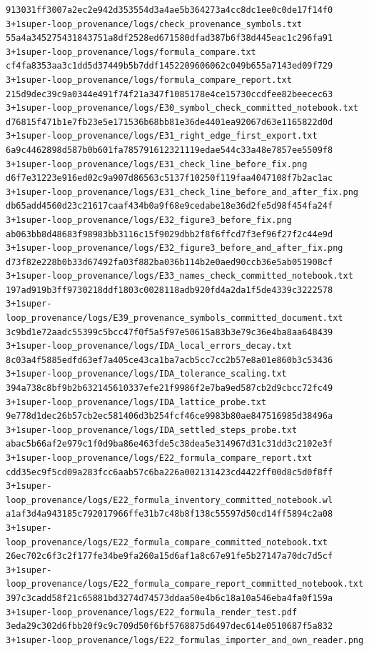 \documentclass[
  10pt,
]{article}
\begin{document}
\begin{verbatim}
913031ff3007a2ec2e942d353554d3a4ae5b364273a4cc8dc1ee0c0de17f14f0  3+1super-loop_provenance/logs/check_provenance_symbols.txt
55a4a345275431843751a8df2528ed671580dfad387b6f38d445eac1c296fa91  3+1super-loop_provenance/logs/formula_compare.txt
cf4fa8353aa3c1dd5d37449b5b7ddf1452209606062c049b655a7143ed09f729  3+1super-loop_provenance/logs/formula_compare_report.txt
215d9dec39c9a0344e491f74f21a347f1085178e4ce15730ccdfee82beecec63  3+1super-loop_provenance/logs/E30_symbol_check_committed_notebook.txt
d76815f471b1e7fb23e5e171536b68bb81e36de4401ea92067d63e1165822d0d  3+1super-loop_provenance/logs/E31_right_edge_first_export.txt
6a9c4462898d587b0b601fa785791612321119edae544c33a48e7857ee5509f8  3+1super-loop_provenance/logs/E31_check_line_before_fix.png
d6f7e31223e916ed02c9a907d86563c5137f10250f119faa4047108f7b2ac1ac  3+1super-loop_provenance/logs/E31_check_line_before_and_after_fix.png
db65add4560d23c21617caaf434b0a9f68e9cedabe18e36d2fe5d98f454fa24f  3+1super-loop_provenance/logs/E32_figure3_before_fix.png
ab063bb8d48683f98983bb3116c15f9029dbb2f8f6ffcd7f3ef96f27f2c44e9d  3+1super-loop_provenance/logs/E32_figure3_before_and_after_fix.png
d73f82e228b0b33d67492fa03f882ba036b114b2e0aed90ccb36e5ab051908cf  3+1super-loop_provenance/logs/E33_names_check_committed_notebook.txt
197ad919b3ff9730218ddf1803c0028118adb920fd4a2da1f5de4339c3222578  3+1super-loop_provenance/logs/E39_provenance_symbols_committed_document.txt
3c9bd1e72aadc55399c5bcc47f0f5a5f97e50615a83b3e79c36e4ba8aa648439  3+1super-loop_provenance/logs/IDA_local_errors_decay.txt
8c03a4f5885edfd63ef7a405ce43ca1ba7acb5cc7cc2b57e8a01e860b3c53436  3+1super-loop_provenance/logs/IDA_tolerance_scaling.txt
394a738c8bf9b2b632145610337efe21f9986f2e7ba9ed587cb2d9cbcc72fc49  3+1super-loop_provenance/logs/IDA_lattice_probe.txt
9e778d1dec26b57cb2ec581406d3b254fcf46ce9983b80ae847516985d38496a  3+1super-loop_provenance/logs/IDA_settled_steps_probe.txt
abac5b66af2e979c1f0d9ba86e463fde5c38dea5e314967d31c31dd3c2102e3f  3+1super-loop_provenance/logs/E22_formula_compare_report.txt
cdd35ec9f5cd09a283fcc6aab57c6ba226a002131423cd4422ff00d8c5d0f8ff  3+1super-loop_provenance/logs/E22_formula_inventory_committed_notebook.wl
a1af3d4a943185c792017966ffe31b7c48b8f138c55597d50cd14ff5894c2a08  3+1super-loop_provenance/logs/E22_formula_compare_committed_notebook.txt
26ec702c6f3c2f177fe34be9fa260a15d6af1a8c67e91fe5b27147a70dc7d5cf  3+1super-loop_provenance/logs/E22_formula_compare_report_committed_notebook.txt
397c3cadd58f21c65881bd3274d74573ddaa50e4b6c18a10a546eba4fa0f159a  3+1super-loop_provenance/logs/E22_formula_render_test.pdf
3eda29c302d6fbb20f9c9c709d50f6bf5768875d6497dec614e0510687f5a832  3+1super-loop_provenance/logs/E22_formulas_importer_and_own_reader.png

\end{verbatim}
\end{document}
